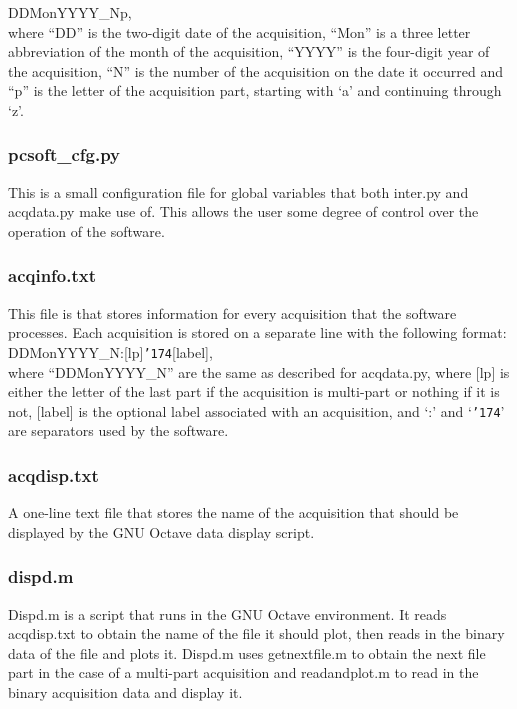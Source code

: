 DDMonYYYY\_Np, \\

where ``DD'' is the two-digit date of the acquisition, ``Mon'' is a three letter abbreviation 
of the month of the acquisition, ``YYYY'' is the four-digit year of the acquisition, ``N'' is 
the number of the acquisition on the date it occurred and ``p'' is the letter of the acquisition part, starting with `a' and continuing through `z'. 


\subsubsection[pcsoft\_cfg.py]{pcsoft\_cfg.py}
This is a small configuration file for global variables that both inter.py and acqdata.py make
use of. This allows the user some degree of control over the operation of the software.


\subsubsection[acqinfo.txt]{acqinfo.txt}
This file is that stores information for every acquisition that the software processes. Each
acquisition is stored on a separate line with the following format: \\

DDMonYYYY\_N:[lp]{\tt\char'174}[label], \\

where ``DDMonYYYY\_N'' are the same as described for acqdata.py, where [lp] is either
the letter of the last part if the acquisition is multi-part or nothing if it is not, [label]
is the optional label associated with an acquisition, and `:' and `{\tt\char'174}' are separators used by
the software.


\subsubsection[acqdisp.txt]{acqdisp.txt}
A one-line text file that stores the name of the acquisition that should be displayed by
the GNU Octave data display script.


\subsubsection[dispd.m]{dispd.m}
Dispd.m is a script that runs in the GNU Octave environment. It reads acqdisp.txt to obtain
the name of the file it should plot, then reads in the binary data of the file and plots it.
Dispd.m uses getnextfile.m to obtain the next file part in the case of a multi-part
acquisition and readandplot.m to read in the binary acquisition data and display it.


